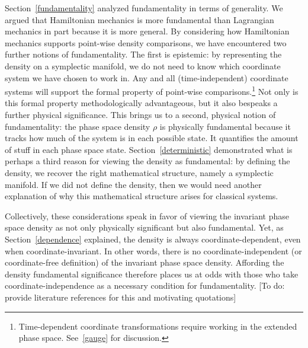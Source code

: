 \documentclass[letterpaper]{article}
\begin{document}
Section~\ref{fundamentality} analyzed fundamentality in terms of generality. We argued that Hamiltonian mechanics is more fundamental than Lagrangian mechanics in part because it is more general. By considering how Hamiltonian mechanics supports point-wise density comparisons, we have encountered two further notions of fundamentality. The first is epistemic: by representing the density on a symplectic manifold, we do not need to know which coordinate system we have chosen to work in. Any and all (time-independent) coordinate systems will support the formal property of point-wise comparisons.\footnote{Time-dependent coordinate transformations require working in the extended phase space. See~\ref{gauge} for discussion.} Not only is this formal property methodologically advantageous, but it also bespeaks a further physical significance. This brings us to a second, physical notion of fundamentality: the phase space density $\rho$ is physically fundamental because it tracks how much of the system is in each possible state. It quantifies the amount of stuff in each phase space state. Section~\ref{deterministic} demonstrated what is perhaps a third reason for viewing the density as fundamental: by defining the density, we recover the right mathematical structure, namely a symplectic manifold. If we did not define the density, then we would need another explanation of why this mathematical structure arises for classical systems. 

Collectively, these considerations speak in favor of viewing the invariant phase space density as not only physically significant but also fundamental. Yet, as Section~\ref{dependence} explained, the density is always coordinate-dependent, even when coordinate-invariant. In other words, there is no coordinate-independent (or coordinate-free definition) of the invariant phase space density. Affording the density fundamental significance therefore places us at odds with those who take coordinate-independence as a necessary condition for fundamentality. [To do: provide literature references for this and motivating quotations]
\end{document}
